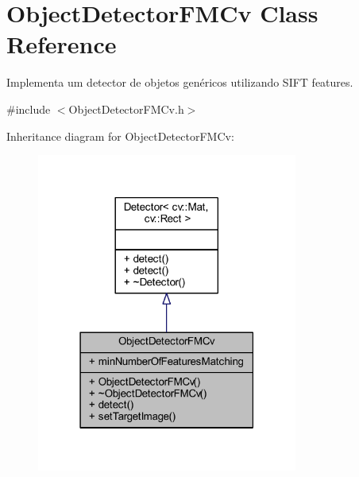 \hypertarget{class_viscv_1_1_object_detector_f_m_cv}{}\section{Object\+Detector\+F\+M\+Cv Class Reference}
\label{class_viscv_1_1_object_detector_f_m_cv}


Implementa um detector de objetos genéricos utilizando S\+I\+F\+T features.  




{\ttfamily \#include $<$Object\+Detector\+F\+M\+Cv.\+h$>$}



Inheritance diagram for Object\+Detector\+F\+M\+Cv\+:
\nopagebreak
\begin{figure}[H]
\begin{center}
\leavevmode
\includegraphics[width=243pt]{class_viscv_1_1_object_detector_f_m_cv__inherit__graph}
\end{center}
\end{figure}


